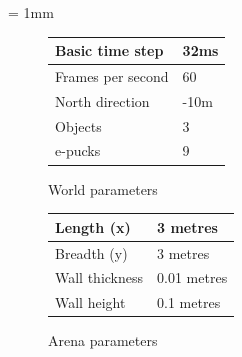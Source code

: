 \tabulinesep = 1mm
\begin{figure}[!h]
	\centering
	\begin{minipage}{.45\textwidth}
		\centering
		\begin{tabu} to .75\textwidth { | X[l] | X[c] | }
			\hline
			Basic time step & 32ms \\
			\hline
			Frames per second & 60 \\
			\hline
			North direction & -10m \\
			\hline
			Objects & 3 \\
			\hline
			e-pucks & 9 \\
			\hline
		\end{tabu}
	\caption{World parameters} 	%
	\label{fig:world-param} 	%
	\end{minipage}
	\begin{minipage}{.45\textwidth}
		\centering
		\begin{tabu} to .75\textwidth { | X[l] | X[c] | }
			\hline
			Length (x) & 3 metres \\
			\hline
			Breadth (y) & 3 metres \\
			\hline
			Wall thickness & 0.01 metres \\
			\hline
			Wall height & 0.1 metres \\
			\hline
		\end{tabu}
	\caption{Arena parameters} 	%
	\label{fig:arena-param} 	%
	\end{minipage}
\end{figure}


